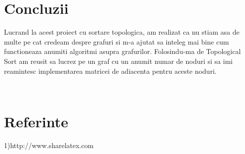 ﻿\documentclass[14pt]{article}
\begin{document}
\newpage
\section*{Concluzii}
\vspace{20 mm}
Lucrand la acest proiect cu sortare topologica, am realizat ca nu stiam asa de multe pe cat credeam despre grafuri si m-a ajutat sa inteleg mai bine cum functioneaza anumiti algoritmi asupra grafurilor. Folosindu-ma de Topological Sort am reusit sa lucrez pe un graf cu un anumit numar de noduri si sa imi reamintesc implementarea matricei de adiacenta pentru aceste noduri.

\\\vspace{20mm}
\section*{Referinte}
\large 1)http://www.sharelatex.com
\end{document}
